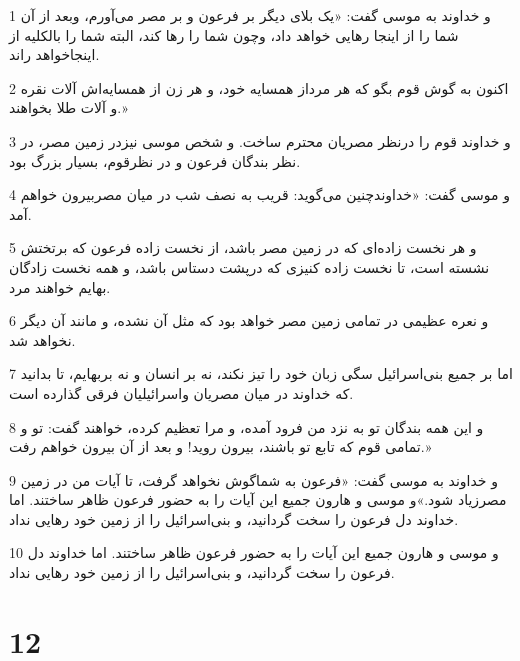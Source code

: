 \par 1 و خداوند به موسی گفت: «یک بلای دیگر بر فرعون و بر مصر می‌آورم، وبعد از آن شما را از اینجا رهایی خواهد داد، وچون شما را رها کند، البته شما را بالکلیه از اینجاخواهد راند.
\par 2 اکنون به گوش قوم بگو که هر مرداز همسایه خود، و هر زن از همسایه‌اش آلات نقره و آلات طلا بخواهند.»
\par 3 و خداوند قوم را درنظر مصریان محترم ساخت. و شخص موسی نیزدر زمین مصر، در نظر بندگان فرعون و در نظرقوم، بسیار بزرگ بود.
\par 4 و موسی گفت: «خداوندچنین می‌گوید: قریب به نصف شب در میان مصربیرون خواهم آمد.
\par 5 و هر نخست زاده‌ای که در زمین مصر باشد، از نخست زاده فرعون که برتختش نشسته است، تا نخست زاده کنیزی که درپشت دستاس باشد، و همه نخست زادگان بهایم خواهند مرد.
\par 6 و نعره عظیمی در تمامی زمین مصر خواهد بود که مثل آن نشده، و مانند آن دیگر نخواهد شد.
\par 7 اما بر جمیع بنی‌اسرائیل سگی زبان خود را تیز نکند، نه بر انسان و نه بربهایم، تا بدانید که خداوند در میان مصریان واسرائیلیان فرقی گذارده است.
\par 8 و این همه بندگان تو به نزد من فرود آمده، و مرا تعظیم کرده، خواهند گفت: تو و تمامی قوم که تابع تو باشند، بیرون روید! و بعد از آن بیرون خواهم رفت.»
\par 9 و خداوند به موسی گفت: «فرعون به شماگوش نخواهد گرفت، تا آیات من در زمین مصرزیاد شود.»و موسی و هارون جمیع این آیات را به حضور فرعون ظاهر ساختند. اما خداوند دل فرعون را سخت گردانید، و بنی‌اسرائیل را از زمین خود رهایی نداد.
\par 10 و موسی و هارون جمیع این آیات را به حضور فرعون ظاهر ساختند. اما خداوند دل فرعون را سخت گردانید، و بنی‌اسرائیل را از زمین خود رهایی نداد.
 
\chapter{12}

